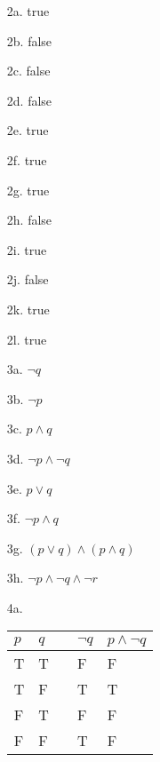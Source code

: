 {\begin{enumerate}
        \item[2a.]  true
        \item[2b.]  false
        \item[2c.]  false
        \item[2d.]  false

        \item[2e.]  true
        \item[2f.]  true
        \item[2g.]  true
        \item[2h.]  false

        \item[2i.]  true
        \item[2j.]  false
        \item[2k.]  true
        \item[2l.]  true

        \item[3a.]  $\neg q$
        \item[3b.]  $\neg p$
        \item[3c.]  $p \land q$
        \item[3d.]  $\neg p \land \neg q$
        \item[3e.]  $p \lor q$
        \item[3f.]  $\neg p \land q$
        \item[3g.]  $(p \lor q) \land (p \land q)$
        \item[3h.]  $\neg p \land \neg q \land \neg r$

        \item[4a.]
            \begin{tabular}{ | p{1cm} | p{1cm} | c | p{2cm} | p{3cm} | }
                \hline
                $p$ & $q$ & & $\neg q$ & $p \land \neg q$ \\ \hline
                T & T & & F & F 
                \\ \hline
                T & F & & T & T 
                \\ \hline
                F & T & & F & F 
                \\ \hline
                F & F & & T & F 
                \\ \hline
            \end{tabular}


\end{enumerate}}
